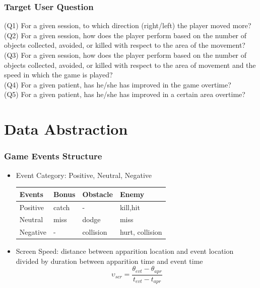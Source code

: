 \documentclass{beamer}
\begin{document}
\begin{frame}
\frametitle{Target User Question}
(Q1) For a given session, to which direction (right/left) the player moved more?\\ 
(Q2) For a given session, how does the player perform based on the number of objects collected, avoided, or killed with respect to the area of the movement?\\
(Q3) For a given session, how does the player perform based on the number of objects collected, avoided, or killed with respect to the area of movement and the speed in which the game is played?\\ 
(Q4) For a given patient, has he/she has improved in the game overtime?\\ 
(Q5) For a given patient, has he/she has improved in a certain area overtime?


\end{frame}
\section{Data Abstraction}
\begin{frame}
\frametitle{Game Events Structure}
\begin{itemize}
\item Event Category: Positive, Neutral, Negative
\begin{table}[h]
\begin{center}
    \begin{tabular}{| l | l | l | l |}
    \hline
    Events & Bonus & Obstacle & Enemy \\ \hline
    Positive & catch & - & kill,hit\\ \hline
    Neutral & miss & dodge & miss\\ \hline
    Negative & - & collision & hurt, collision\\
    \hline
    \end{tabular}
    \label{tblEventType}
\end{center}
\end{table}
\item Screen Speed: distance between apparition location and event location divided by duration between apparition time and event time
$$ \upsilon_{scr} = \frac{\theta_{evt}-\theta_{apr}}{\textit{t}_{evt}-\textit{t}_{apr}} $$
\end{itemize}
\end{frame}
\end{document}
